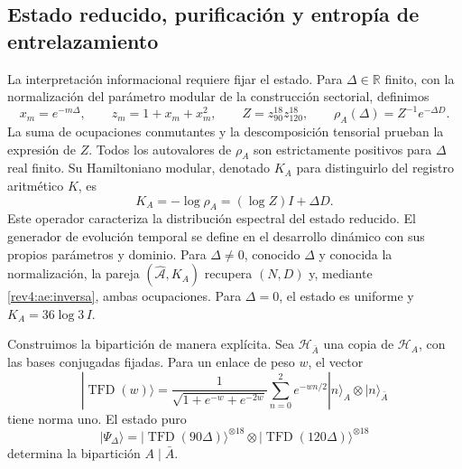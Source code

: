 \subsection{Estado reducido, purificación y entropía de entrelazamiento}

La interpretación informacional requiere fijar el estado. Para
\(\Delta\in\mathbb R\) finito, con la normalización del parámetro
modular de la construcción sectorial, definimos
\begin{equation}
 x_m=e^{-m\Delta},\qquad z_m=1+x_m+x_m^2,
 \qquad Z=z_{90}^{18}z_{120}^{18},
 \qquad \rho_A(\Delta)=Z^{-1}e^{-\Delta D}.
 \label{rev4:ae:rho}
\end{equation}
La suma de ocupaciones conmutantes y la descomposición tensorial prueban
la expresión de \(Z\). Todos los autovalores de \(\rho_A\) son
estrictamente positivos para \(\Delta\) real finito. Su Hamiltoniano
modular, denotado \(K_A\) para distinguirlo del registro aritmético
\(K\), es
\begin{equation}
 K_A=-\log\rho_A=(\log Z)I+\Delta D.
 \label{rev4:ae:modular}
\end{equation}
Este operador caracteriza la distribución espectral del estado reducido.
El generador de evolución temporal se define en el desarrollo dinámico
con sus propios parámetros y dominio. Para \(\Delta\ne0\), conocido
\(\Delta\) y conocida la normalización, la pareja
\((\widehat{\mathcal A},K_A)\) recupera \((N,D)\) y, mediante
\eqref{rev4:ae:inversa}, ambas ocupaciones. Para \(\Delta=0\),
el estado es uniforme y \(K_A=36\log3\,I\).

Construimos la bipartición de manera explícita. Sea \(\mathscr H_{\bar A}\)
una copia de \(\mathscr H_A\), con las bases conjugadas fijadas. Para
un enlace de peso \(w\), el vector
\[
 |\operatorname{TFD}(w)\rangle
 =\frac1{\sqrt{1+e^{-w}+e^{-2w}}}
 \sum_{n=0}^{2}e^{-wn/2}|n\rangle_A\otimes|n\rangle_{\bar A}
\]
tiene norma uno. El estado puro
\begin{equation}
 |\Psi_\Delta\rangle
 =|\operatorname{TFD}(90\Delta)\rangle^{\otimes18}
  \otimes|\operatorname{TFD}(120\Delta)\rangle^{\otimes18}
 \label{rev4:ae:tfd}
\end{equation}
determina la bipartición \(A\mid\bar A\).

